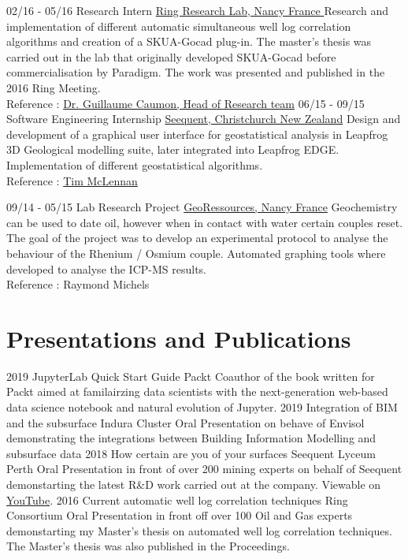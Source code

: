 \documentclass[]{friggeri-cv}
\begin{document}
    \vspace*{\fill}
    \begin{entrylist}
    \entry
    {02/16 - 05/16}
    {Research Intern}
    {\href{http://www.ring-team.org/}{Ring Research Lab, Nancy France }}
    {Research and implementation of different automatic simultaneous well log correlation algorithms and creation of a SKUA-Gocad plug-in. The master's thesis was carried out in the lab that originally developed SKUA-Gocad before commercialisation by Paradigm. The work was presented and published in the 2016 Ring Meeting. \\Reference : \href{mailto:Guillaume.Caumon@ensg.univ-lorraine.fr}{Dr. Guillaume Caumon, Head of Research team}}
    \entry
    {06/15 - 09/15}
    {Software Engineering Internship}
    {\href{https://www.seequent.com/}{Seequent, Christchurch New Zealand}}
    {Design and development of a graphical user interface for geostatistical analysis in Leapfrog 3D Geological modelling suite, later integrated into Leapfrog EDGE. Implementation of different geostatistical algorithms.
    \\
    Reference : \href{mailto:tim.mclennan@seequent.com}{Tim McLennan}}

	\entry
	{09/14 - 05/15}
	{Lab Research Project}
	{\href{http://georessources.univ-lorraine.fr/}{GeoRessources, Nancy France}}
	{Geochemistry can be used to date oil, however when in contact with water certain couples reset. The goal of the project was to develop an experimental protocol to analyse the behaviour of the Rhenium / Osmium couple. Automated graphing tools where developed to analyse the ICP-MS results.
		\\
		Reference : Raymond Michels}
\end{entrylist}
\section{Presentations and Publications}
\begin{entrylist}
	\entry
	{2019}
	{JupyterLab Quick Start Guide}
	{Packt}
	{Coauthor of the book written for Packt aimed at familairzing data scientists with the next-generation web-based data science notebook and natural evolution of Jupyter. }
	\entry
	{2019}
	{Integration of BIM and the subsurface}
	{Indura Cluster}
	{Oral Presentation on behave of Envisol demonstrating the integrations between Building Information Modelling and subsurface data}
	\entry
	{2018}
	{How certain are you of your surfaces}
	{Seequent Lyceum Perth}
	{Oral Presentation in front of over 200 mining experts on behalf of Seequent demonstarting the latest R\&D work carried out at the company. Viewable on \href{https://www.youtube.com/watch?v=jt26J5ljlA0}{YouTube}.}
	\entry
	{2016}
	{Current automatic well log correlation techniques}
	{Ring Consortium}
	{Oral Presentation in front off over 100 Oil and Gas experts demonstarting my Master's thesis on automated well log correlation techniques. The Master's thesis was also published in the Proceedings.}
\end{entrylist}
\end{document}
